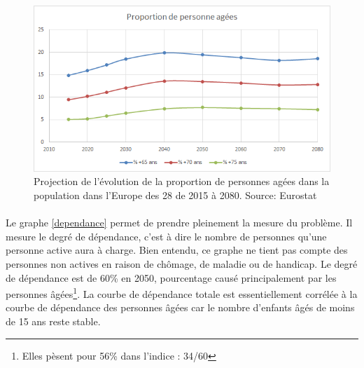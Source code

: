 \begin{figure}[h!]
    \begin{center}
        \includegraphics[scale=0.7]{document/proj_prop.png}
        \caption{Projection de l'évolution de la proportion de personnes agées dans la population dans l'Europe des 28 de 2015 à 2080. Source: Eurostat~\citep{eurostat_europop13}}
        \label{proj_prop}
    \end{center}
\end{figure}

\paragraph{}Le graphe \ref{dependance} permet de prendre pleinement la mesure du problème. Il mesure le degré de dépendance, c'est à dire le nombre de personnes qu’une personne active aura à charge. Bien entendu, ce graphe ne tient pas compte des personnes non actives en raison de chômage, de maladie ou de handicap. Le degré de dépendance est de 60\% en 2050, pourcentage causé principalement par les personnes âgées\footnote{ Elles pèsent pour 56\% dans l’indice : 34/60}. La courbe de dépendance totale est essentiellement corrélée à la courbe de dépendance des personnes âgées car le nombre d’enfants âgés de moins de 15 ans reste stable. 



